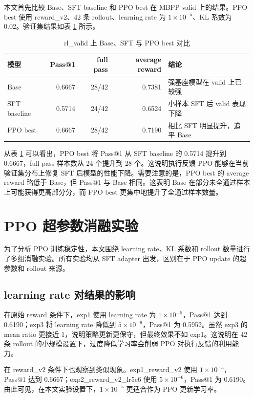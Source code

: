 本文首先比较 Base、SFT baseline 和 PPO best 在 MBPP valid 上的结果。PPO best 使用 reward\_v2、42 条 rollout、learning rate 为 $1\times10^{-5}$、KL 系数为 0.02。验证集结果如表 \ref{tab:valid-main} 所示。

\begin{table}[!htp]
  \centering
  \caption{rl\_valid 上 Base、SFT 与 PPO best 对比}
  \label{tab:valid-main}
  \begin{tabular}{lrrrl}
    \toprule
    模型 & Pass@1 & full pass & average reward & 结论 \\
    \midrule
    Base & 0.6667 & 28/42 & 0.7381 & 强基座模型在 valid 上已较强 \\
    SFT baseline & 0.5714 & 24/42 & 0.6524 & 小样本 SFT 后 valid 表现下降 \\
    PPO best & 0.6667 & 28/42 & 0.7190 & 相比 SFT 明显提升，追平 Base \\
    \bottomrule
  \end{tabular}
\end{table}

从表 \ref{tab:valid-main} 可以看出，PPO best 将 Pass@1 从 SFT baseline 的 0.5714 提升到 0.6667，full pass 样本数从 24 个提升到 28 个。这说明执行反馈 PPO 能够在当前验证集分布上修复 SFT 后模型的性能下降。需要注意的是，PPO best 的 average reward 略低于 Base，但 Pass@1 与 Base 相同。这表明 Base 在部分未全通过样本上可能获得更高部分分，而 PPO best 更集中地提升了全通过样本数量。

\section{PPO 超参数消融实验}

为了分析 PPO 训练稳定性，本文围绕 learning rate、KL 系数和 rollout 数量进行了多组消融实验。所有实验均从 SFT adapter 出发，区别在于 PPO update 的超参数和 rollout 来源。

\subsection{learning rate 对结果的影响}

在原始 reward 条件下，exp1 使用 learning rate 为 $1\times10^{-5}$，Pass@1 达到 0.6190；exp3 将 learning rate 降低到 $5\times10^{-6}$，Pass@1 为 0.5952。虽然 exp3 的 mean ratio 更接近 1，说明策略更新更保守，但最终效果不如 exp1。这说明在 42 条 rollout 的小规模设置下，过度降低学习率会削弱 PPO 对执行反馈的利用能力。

在 reward\_v2 条件下也观察到类似现象。exp1\_reward\_v2 使用 $1\times10^{-5}$，Pass@1 达到 0.6667；exp2\_reward\_v2\_lr5e6 使用 $5\times10^{-6}$，Pass@1 为 0.6190。由此可见，在本文实验设置下，$1\times10^{-5}$ 更适合作为 PPO 更新学习率。


